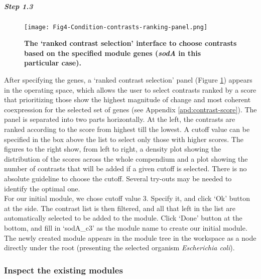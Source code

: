 \begin{small}
\subparagraph{Step 1.3}	
%
\begin{figure}[b]
	\centering
  	\texttt{[image: Fig4-Condition-contrasts-ranking-panel.png]}
	\caption[COLOMBOS contrast ranking interface]{\textbf{The `ranked contrast 
	selection' interface to choose contrasts based on the specified module 
	genes (\textit{sodA} in this particular case).}}
	\label{fig:colombos-ranking}
\end{figure}
%
After specifying the genes, a `ranked contrast selection' panel
(Figure \ref{fig:colombos-ranking}) appears in the operating space, which allows
the user to select contrasts ranked by a score that prioritizing those show
the highest magnitude of change and most coherent coexpression for the
selected set of genes (see Appendix \ref{apd:contrast-score}). The panel is
separated into two parts horizontally.  At the left, the contrasts are ranked
according to the score from highest till the lowest. A cutoff value can be
specified in the box above the list to select only those with higher
scores. The figures to the right show, from left to right, a density plot
showing the distribution of the scores across the whole compendium and a plot
showing the number of contrasts that will be added if a given cutoff is
selected.  There is no absolute guideline to choose the cutoff. Several
try-outs may be needed to identify the optimal one.
\\
For our initial module, we chose cutoff value 3. Specify it, and click `Ok'
button at the side. The contrast list is then filtered, and all that left in
the list are automatically selected to be added to the module. Click `Done'
button at the bottom, and fill in `sodA\_c3' as the module name to create our
initial module.  The newly created module appears in the module tree in the
workspace as a node directly under the root (presenting the selected organism
\textit{Escherichia coli}).


\end{small} %



\subsubsection{Inspect the existing modules}

